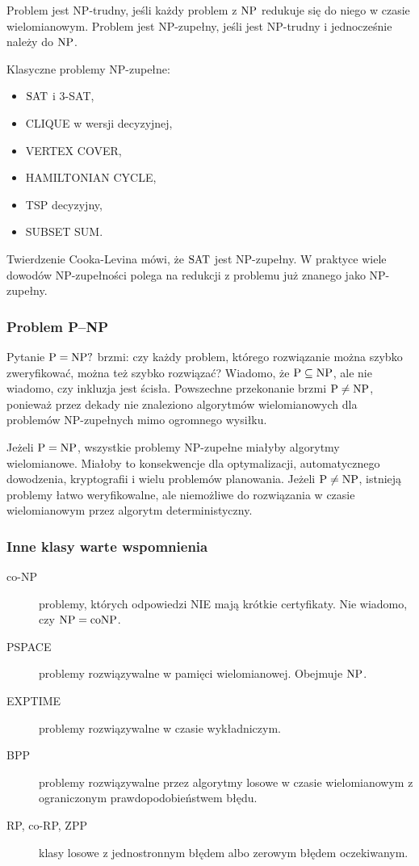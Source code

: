 Problem jest NP-trudny, jeśli każdy problem z $\mathrm{NP}$ redukuje się do niego w czasie wielomianowym. Problem jest NP-zupełny, jeśli jest NP-trudny i jednocześnie należy do $\mathrm{NP}$.

Klasyczne problemy NP-zupełne:
\begin{itemize}
  \item $\mathrm{SAT}$ i 3-SAT,
  \item CLIQUE w wersji decyzyjnej,
  \item VERTEX COVER,
  \item HAMILTONIAN CYCLE,
  \item TSP decyzyjny,
  \item SUBSET SUM.
\end{itemize}

Twierdzenie Cooka-Levina mówi, że $\mathrm{SAT}$ jest NP-zupełny. W praktyce wiele dowodów NP-zupełności polega na redukcji z problemu już znanego jako NP-zupełny.

\subsubsection{Problem P--NP}

Pytanie $\mathrm{P}=\mathrm{NP}?$ brzmi: czy każdy problem, którego rozwiązanie można szybko zweryfikować, można też szybko rozwiązać? Wiadomo, że $\mathrm{P}\subseteq\mathrm{NP}$, ale nie wiadomo, czy inkluzja jest ścisła. Powszechne przekonanie brzmi $\mathrm{P}\ne\mathrm{NP}$, ponieważ przez dekady nie znaleziono algorytmów wielomianowych dla problemów NP-zupełnych mimo ogromnego wysiłku.

Jeżeli $\mathrm{P}=\mathrm{NP}$, wszystkie problemy NP-zupełne miałyby algorytmy wielomianowe. Miałoby to konsekwencje dla optymalizacji, automatycznego dowodzenia, kryptografii i wielu problemów planowania. Jeżeli $\mathrm{P}\ne\mathrm{NP}$, istnieją problemy łatwo weryfikowalne, ale niemożliwe do rozwiązania w czasie wielomianowym przez algorytm deterministyczny.

\subsubsection{Inne klasy warte wspomnienia}

\begin{description}
  \item[co-NP] problemy, których odpowiedzi NIE mają krótkie certyfikaty. Nie wiadomo, czy $\mathrm{NP}=\mathrm{coNP}$.
  \item[PSPACE] problemy rozwiązywalne w pamięci wielomianowej. Obejmuje $\mathrm{NP}$.
  \item[EXPTIME] problemy rozwiązywalne w czasie wykładniczym.
  \item[BPP] problemy rozwiązywalne przez algorytmy losowe w czasie wielomianowym z ograniczonym prawdopodobieństwem błędu.
  \item[RP, co-RP, ZPP] klasy losowe z jednostronnym błędem albo zerowym błędem oczekiwanym.
\end{description}


